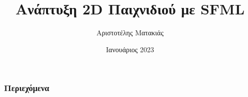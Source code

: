 \documentclass{beamer}
\title[\foreignlanguage{english}{SFML Game Development}]{Ανάπτυξη \foreignlanguage{english}{2D} Παιχνιδιού με \foreignlanguage{english}{SFML}}
\author{Αριστοτέλης Ματακιάς}
\institute[ΠαΠει] %
{
	Πανεπιστήμιο Πειραιώς\\[1cm]Επιβλέπων καθηγητής: Θεμιστοκλής Παναγιωτόπουλος
}
\date[Ιανουάριος 2023] %
{Ιανουάριος 2023}
\begin{document}
	
	
	\frame{\titlepage}
	
	
	\begin{frame}
		\frametitle{Περιεχόμενα}
		\tableofcontents
	\end{frame}
	
%	
%	
%		
%		
%	
%		
%		
%		
%		
%	
\end{document}
